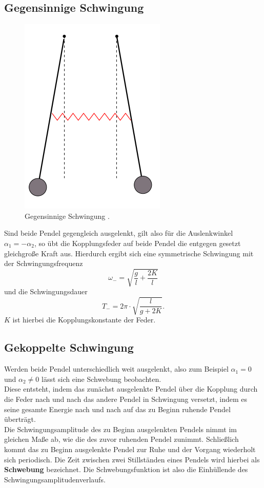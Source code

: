 \subsection{Gegensinnige Schwingung}
\FloatBarrier
\begin{figure}
	\centering
	\includegraphics[width=0.4\linewidth]{Bilder/gegenphasig.png}
	\caption{Gegensinnige Schwingung \cite{Anleitung}.}
	\label{fig:gegen}
\end{figure}
\FloatBarrier
Sind beide Pendel gegengleich ausgelenkt, gilt also für die Auslenkwinkel $\alpha_1=-\alpha_2$, so übt die Kopplungsfeder auf beide Pendel die entgegen gesetzt gleichgroße Kraft aus.
Hierdurch ergibt sich eine symmetrische Schwingung mit der Schwingungsfrequenz
\begin{equation}
	\label{eqn:wgegen}
	\omega_{\mathrm{-}}=\sqrt{\frac{g}{l}+\frac{2 K}{l}}
\end{equation}
und die Schwingungsdauer
\begin{equation}
	\label{eqn:tgegen}
	T_{\mathrm{-}}=2\pi\cdot\sqrt{\frac{l}{g+2K}} \text{.}
\end{equation}
$K$ ist hierbei die Kopplungskonstante der Feder.
\subsection{Gekoppelte Schwingung}
Werden beide Pendel unterschiedlich weit ausgelenkt, also zum Beispiel $\alpha_1=0$ und $\alpha_2 \neq 0$ lässt sich eine Schwebung beobachten.\\
Diese entsteht, indem das zunächst ausgelenkte Pendel über die Kopplung durch die Feder nach und nach das andere Pendel in Schwingung versetzt, indem es seine gesamte Energie nach und nach auf das zu Beginn ruhende Pendel überträgt.\\
Die Schwingungsamplitude des zu Beginn ausgelenkten Pendels nimmt im gleichen Maße ab, wie die des zuvor ruhenden Pendel zunimmt.
Schließlich kommt das zu Beginn ausgelenkte Pendel zur Ruhe und der Vorgang wiederholt sich periodisch.
Die Zeit zwischen zwei Stillständen eines Pendels wird hierbei als \textbf{Schwebung} bezeichnet.
Die Schwebungsfunktion ist also die Einhüllende des Schwingungsamplitudenverlaufs.
\FloatBarrier

